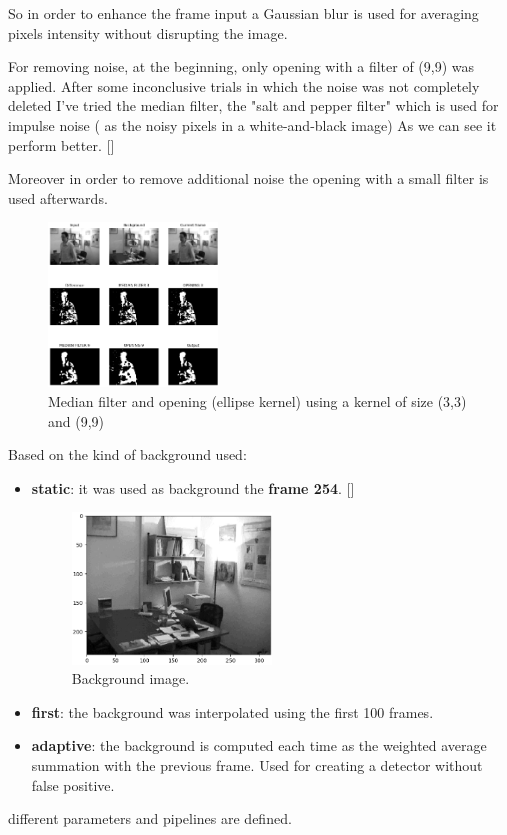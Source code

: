\documentclass{article}
\newcommand{\CREF}[1]{[\hyperref[#1]{\Cref{#1}}]}
\begin{document}
So in order to enhance the frame input a Gaussian blur is used for averaging pixels intensity without disrupting the image.

For removing noise, at the beginning, only opening with a filter of (9,9) was applied.
After some inconclusive trials in which the noise was not completely deleted I've tried the median filter, the "salt and pepper filter" which is used for impulse noise ( as the noisy pixels in a white-and-black image)
As we can see it perform better. \CREF{medfilter}

Moreover in order to remove additional noise the opening with a small filter is used afterwards.
\begin{figure}
    \centering
    \includegraphics[width=0.4\textwidth,keepaspectratio]{median filter.png}
    \caption{Median filter and opening (ellipse kernel) using a kernel of size (3,3) and (9,9) }
    \label{medfilter}
\end{figure}


Based on the kind of background used:
    \begin{itemize}
        \item \textbf{static}: it was used as background the \textbf{frame 254}. \CREF{bg}
              \begin{figure}[ht]
                  \centering
                  \includegraphics[width=0.5\textwidth,keepaspectratio]{bg.png}
                  \caption{Background image.\label{bg}}
              \end{figure}
        \item \textbf{first}: the background was interpolated using the first 100 frames.
        \item \textbf{adaptive}: the background is computed each time as the weighted average summation with the previous frame. Used for creating a detector without false positive.
    \end{itemize}  
different parameters and pipelines are defined.
\end{document}
